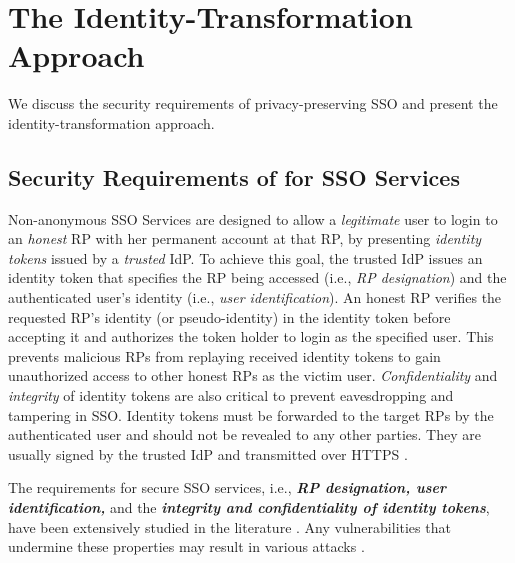 \section{The Identity-Transformation Approach}
\label{sec:challenge}

We discuss the security requirements of privacy-preserving SSO and present the identity-transformation approach.


\subsection{Security Requirements of for SSO Services}
\label{subsec:basicrequirements}

Non-anonymous SSO Services \cite{OpenIDConnect,rfc6749,SAML,SAMLIdentifier,NIST2017draft} are designed to allow a \emph{legitimate} user to login to an \emph{honest} RP with her permanent account at that RP, %
by presenting \emph{identity tokens} issued by a \emph{trusted} IdP. To achieve this goal, the trusted IdP issues an identity token that specifies the RP being accessed (i.e., \emph{RP designation}) and  the authenticated user's identity (i.e., \emph{user identification}). An honest RP verifies the requested RP's identity (or pseudo-identity) in the identity token before accepting it and authorizes the token holder to login as the specified user. This prevents malicious RPs from replaying received identity tokens to gain unauthorized access to other honest RPs as the victim user.
\emph{Confidentiality} and \emph{integrity} of identity tokens are also critical to prevent eavesdropping and tampering in SSO. Identity tokens must be forwarded to the target RPs by the authenticated user and should not be revealed to any other parties. %
They are usually signed by the trusted IdP and transmitted over HTTPS \cite{OpenIDConnect,rfc6749,SAML}.

The requirements for secure SSO services, i.e., {\bf {\em RP designation, user identification,}} and the {\bf {\em integrity and confidentiality of identity tokens}}, have been extensively studied in the literature \cite{ArmandoCCCT08, FettKS16, FettKS17}.
Any vulnerabilities that undermine these properties may result in various attacks \cite{SomorovskyMSKJ12, WangCW12, ArmandoCCCPS13, ZhouE14, WangZLLYLG15, WangZLG16, YangLLZH16, MainkaMS16, MainkaMSW17, YangLCZ18, YangLS17, ShiWL19, ChenPCTKT14, ccsSunB12, DiscoveringJCS, dimvaLiM16, CaoSBKVC14, TowardsShehabM14}.


